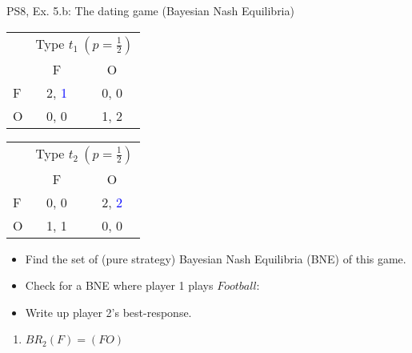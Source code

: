 \begin{frame}{PS8, Ex. 5.b: The dating game (Bayesian Nash Equilibria)}
    \begin{table}
      \begin{tabular}{l|c|c|}
        \multicolumn{1}{c}{} & \multicolumn{2}{c}{Type $t_1\ (p=\frac{1}{2})$} \\
        \multicolumn{1}{c}{} & \multicolumn{1}{c}{F} & \multicolumn{1}{c}{O} \\\cline{2-3}
        F & 2, \textcolor{blue}{1} & 0, 0 \\\cline{2-3}
        O & 0, 0 & 1, 2 \\\cline{2-3}
      \end{tabular}\quad\quad
      \begin{tabular}{l|c|c|}
        \multicolumn{1}{c}{} & \multicolumn{2}{c}{Type $t_2\ (p=\frac{1}{2})$} \\
        \multicolumn{1}{c}{} & \multicolumn{1}{c}{F} & \multicolumn{1}{c}{O} \\\cline{2-3}
        F & 0, 0 & 2, \textcolor{blue}{2} \\\cline{2-3}
        O & 1, 1 & 0, 0 \\\cline{2-3}
      \end{tabular}
    \end{table}
    \begin{itemize}
      \item[(b)] Find the set of (pure strategy) Bayesian Nash Equilibria (BNE) of this game.
    \end{itemize}
    \begin{multicols}{2}
      \begin{itemize}
        \item[Step 1:] Check for a BNE where player 1 plays $Football$:
        \item[1.a:] Write up player 2's best-response.
      \end{itemize}
      \vfill\null\columnbreak
      \begin{enumerate}
        \item[1.a:] $BR_2(F)=(FO)$
      \end{enumerate}
      \vfill\null
    \end{multicols}
\end{frame}
